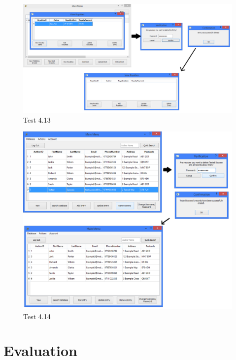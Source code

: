 \begin{landscape}
\begin{figure}[H]
    \includegraphics[width=\textwidth]{./Testing/Evidence/Series4/DeleteRoyaltiesDataTest.png}
    \caption{Test 4.13}  \label{fig:DeleteRoyaltiesDataTest}
\end{figure}

\begin{figure}[H]
    \includegraphics[width=\textwidth]{./Testing/Evidence/Series4/DeleteAuthorDataTest.png}
    \caption{Test 4.14}  \label{fig:DeleteAuthorDataTest}
\end{figure}

\end{landscape}

\section{Evaluation}

